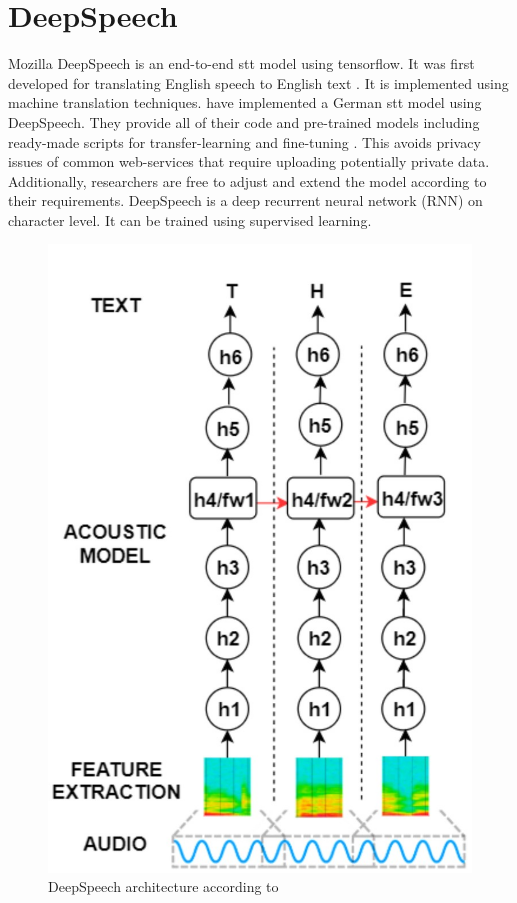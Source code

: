 \section{DeepSpeech}
Mozilla DeepSpeech is an end-to-end \gls{stt} model using tensorflow. It was first developed for translating English speech to English text \cite{Hannun2014DeepSS}. It is implemented using machine
translation techniques. \citet{Agarwal2019GermanES} have implemented a German \gls{stt} model using DeepSpeech. They provide all of their code and pre-trained models including ready-made scripts for
transfer-learning and fine-tuning \cite{Agarwal2019GermanES}. This avoids privacy issues of common web-services that require uploading potentially private data. Additionally, researchers are free to adjust and extend the model according to their requirements. DeepSpeech is a deep recurrent neural network (RNN) on character level. It can be trained using supervised learning.

\begin{figure}[h]
\includegraphics[scale=0.7]{deepspeech-de}
\caption{DeepSpeech architecture according to \citet{Agarwal2019GermanES}}
\label{architecture}
\end{figure}

